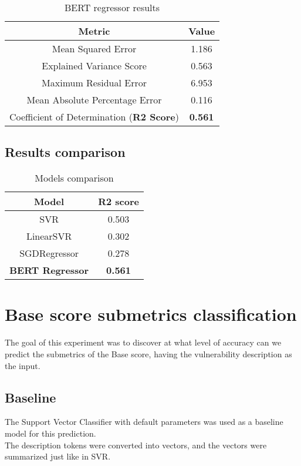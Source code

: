 \documentclass[times, utf8, zavrsni, english]{fer}
\begin{document}
\begin{table}[h!]
		\centering
		\begin{tabular}{|| c | c ||} 
			\hline
			Metric & Value \\ [0.5ex] 
			\hline\hline
			Mean Squared Error & 1.186  \\ \hline
			Explained Variance Score & 0.563\\ \hline
			Maximum Residual Error & 6.953 \\ \hline
			Mean Absolute Percentage Error & 0.116 \\ \hline
			Coefficient of Determination (\textbf{R2 Score}) & \textbf{0.561} \\
			\hline
		\end{tabular}
		\caption{BERT regressor results}
		\label{table:9}
\end{table}
\subsection{Results comparison}
\begin{table}[h!]
	\centering
	\begin{tabular}{|| c | c ||} 
		\hline
		Model & R2 score \\ [0.5ex] 
		\hline\hline
		SVR & 0.503  \\ \hline
		LinearSVR & 0.302 \\ \hline
		SGDRegressor & 0.278 \\ \hline
		\textbf{BERT Regressor} & \textbf{0.561} \\ 
	
		\hline
	\end{tabular}
	\caption{Models comparison}
	\label{table:10}
\end{table}

\section{Base score submetrics classification}
The goal of this experiment was to discover at what level of accuracy can we predict the submetrics of the Base score, having the vulnerability description as the input.
\subsection{Baseline}
The Support Vector Classifier with default parameters was used as a baseline model for this prediction.\\
The description tokens were converted into vectors, and the vectors were summarized just like in SVR.\\
\end{document}
